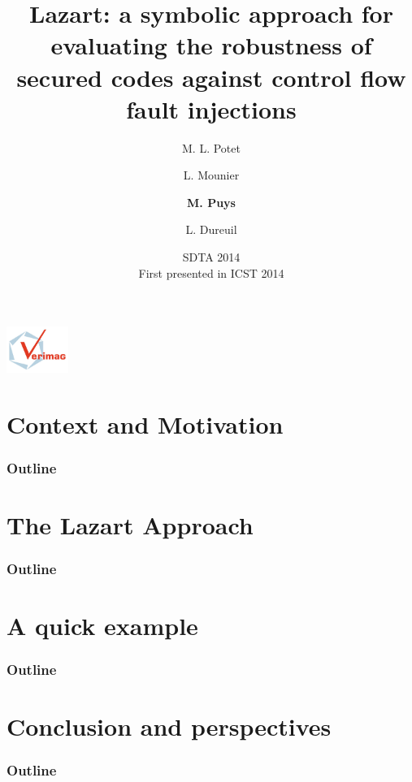 \documentclass{beamer}
\title{{\bf Lazart: a symbolic approach for evaluating the robustness of secured codes 
             against control flow fault injections}}
\author{M. L. Potet \and L. Mounier \and {\bf M. Puys} \and L. Dureuil}
\institute{{\bf\large VERIMAG} \\ ~ \\ {\bf\large University of Grenoble Alpes, France}}
\date{SDTA 2014\\First presented in ICST 2014}
\begin{document}
\begin{frame}
\titlepage

\noindent \includegraphics[height=1.5cm]{logoverimag.jpg} 
\end{frame}

\section{Context and Motivation}

\begin{frame}
    \frametitle{Outline}
    \tableofcontents[]
\end{frame}



\section{The Lazart Approach}


\begin{frame}
    \frametitle{Outline}
    \tableofcontents[currentsection]
\end{frame}



\section{A quick example}

\begin{frame}
    \frametitle{Outline}
    \tableofcontents[currentsection]
\end{frame}



%
%
%

\section{Conclusion and perspectives}

\begin{frame}
    \frametitle{Outline}
    \tableofcontents[currentsection]
\end{frame}


\end{document}
